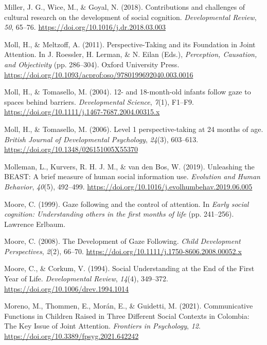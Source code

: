 \documentclass[
]{scrbook}
\newlength{\cslhangindent}
\newenvironment{CSLReferences}[2] %
 {\begin{list}{}{%
  \setlength{\itemindent}{0pt}
  \setlength{\leftmargin}{0pt}
  \setlength{\parsep}{0pt}
  \ifodd #1
   \setlength{\leftmargin}{\cslhangindent}
   \setlength{\itemindent}{-1\cslhangindent}
  \fi
  \setlength{\itemsep}{#2\baselineskip}}}
 {\end{list}}
\begin{document}
\begin{CSLReferences}{1}{0}
Miller, J. G., Wice, M., \& Goyal, N. (2018). Contributions and challenges of cultural research on the development of social cognition. \emph{Developmental Review}, \emph{50}, 65--76. \url{https://doi.org/10.1016/j.dr.2018.03.003}

Moll, H., \& Meltzoff, A. (2011). Perspective-{Taking} and its {Foundation} in {Joint Attention}. In J. Roessler, H. Lerman, \& N. Eilan (Eds.), \emph{Perception, {Causation}, and {Objectivity}} (pp. 286--304). Oxford University Press. \url{https://doi.org/10.1093/acprof:oso/9780199692040.003.0016}

Moll, H., \& Tomasello, M. (2004). 12- and 18-month-old infants follow gaze to spaces behind barriers. \emph{Developmental Science}, \emph{7}(1), F1--F9. \url{https://doi.org/10.1111/j.1467-7687.2004.00315.x}

Moll, H., \& Tomasello, M. (2006). Level 1 perspective-taking at 24 months of age. \emph{British Journal of Developmental Psychology}, \emph{24}(3), 603--613. \url{https://doi.org/10.1348/026151005X55370}

Molleman, L., Kurvers, R. H. J. M., \& van den Bos, W. (2019). Unleashing the {BEAST}: A brief measure of human social information use. \emph{Evolution and Human Behavior}, \emph{40}(5), 492--499. \url{https://doi.org/10.1016/j.evolhumbehav.2019.06.005}

Moore, C. (1999). Gaze following and the control of attention. In \emph{Early social cognition: {Understanding} others in the first months of life} (pp. 241--256). Lawrence Erlbaum.

Moore, C. (2008). The {Development} of {Gaze Following}. \emph{Child Development Perspectives}, \emph{2}(2), 66--70. \url{https://doi.org/10.1111/j.1750-8606.2008.00052.x}

Moore, C., \& Corkum, V. (1994). Social {Understanding} at the {End} of the {First Year} of {Life}. \emph{Developmental Review}, \emph{14}(4), 349--372. \url{https://doi.org/10.1006/drev.1994.1014}

Moreno, M., Thommen, E., Morán, E., \& Guidetti, M. (2021). Communicative {Functions} in {Children Raised} in {Three Different Social Contexts} in {Colombia}: {The Key Issue} of {Joint Attention}. \emph{Frontiers in Psychology}, \emph{12}. \url{https://doi.org/10.3389/fpsyg.2021.642242}


\end{CSLReferences}
\end{document}
